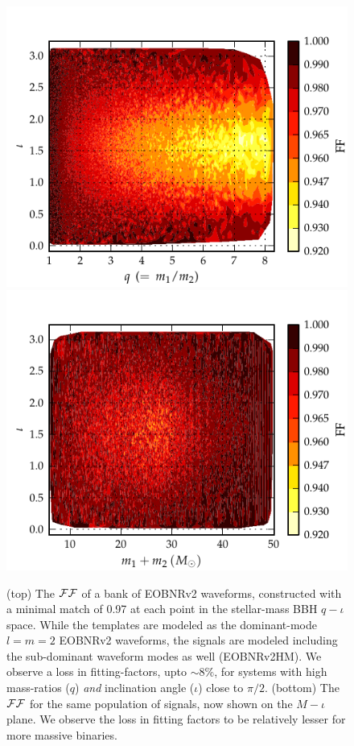 \begin{figure}
\centering
\includegraphics[keepaspectratio=true, scale=0.04, clip=false, height=0.4\textheight]{figures/eobpnmetric/EOBHMvsEOB22incvsq-PRD.pdf} %
\includegraphics[keepaspectratio=true, scale=0.04, clip=false, height=0.4\textheight]{figures/eobpnmetric/EOBHMvsEOB22incvsM-PRD.pdf} %
\caption{\label{fig:incvsM_eob22eobhm} (top) The $\mathcal{FF}$ of a
bank of EOBNRv2 waveforms, constructed with a minimal match of 0.97 at each
point in the stellar-mass BBH $q-\iota$ space. While the templates are
modeled as the dominant-mode $l=m=2$ EOBNRv2 waveforms, the signals are modeled 
including the sub-dominant waveform modes as well (EOBNRv2HM). 
We observe a loss in fitting-factors, upto $\sim 8\%$, for 
systems with high mass-ratios ($q$) \textit{and} inclination angle ($\iota$) 
close to $\pi/2$.
(bottom) The $\mathcal{FF}$ for the same population of signals, now shown on the $M-\iota$
plane. We observe the loss in fitting factors to be relatively lesser
for more massive binaries.}
\end{figure}
